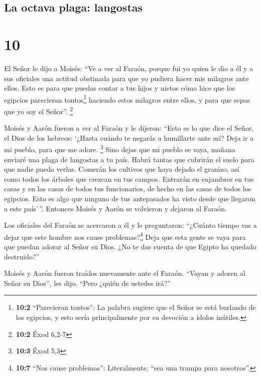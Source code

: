 \hypertarget{la-octava-plaga-langostas}{%
\subsection{La octava plaga:
langostas}\label{la-octava-plaga-langostas}}

\hypertarget{section-9}{%
\section{10}\label{section-9}}

 El Señor le dijo a Moisés: ``Ve a ver al Faraón, porque
fui yo quien le dio a él y a sus oficiales una actitud obstinada para
que yo pudiera hacer mis milagros ante ellos.  Esto es
para que puedas contar a tus hijos y nietos cómo hice que los egipcios
parecieran tontos\footnote{\textbf{10:2} ``Parecieran tontos'': La
  palabra sugiere que el Señor se está burlando de los egipcios, y esto
  sería principalmente por su devoción a ídolos inútiles.} haciendo
estos milagros entre ellos, y para que sepas que yo soy el Señor''.
\footnote{\textbf{10:2} Éxod 6,2-7}

 Moisés y Aarón fueron a ver al Faraón y le dijeron:
``Esto es lo que dice el Señor, el Dios de los hebreos: `¿Hasta cuándo
te negarás a humillarte ante mí? Deja ir a mi pueblo, para que me adore.
\footnote{\textbf{10:3} Éxod 5,3}  Sino dejas que mi
pueblo se vaya, mañana enviaré una plaga de langostas a tu país.
 Habrá tantas que cubrirán el suelo para que nadie pueda
verlas. Comerán los cultivos que haya dejado el granizo, así como todos
los árboles que crezcan en tus campos.  Entrarán en
enjambres en tus casas y en las casas de todos tus funcionarios, de
hecho en las casas de todos los egipcios. Esto es algo que ninguno de
tus antepasados ha visto desde que llegaron a este país'\,''. Entonces
Moisés y Aarón se volvieron y dejaron al Faraón.

 Los oficiales del Faraón se acercaron a él y le
preguntaron: ``¿Cuánto tiempo vas a dejar que este hombre nos cause
problemas?\footnote{\textbf{10:7} ``Nos cause problemas'': Literalmente,
  ``sea una trampa para nosotros''.} Deja que esta gente se vaya para
que puedan adorar al Señor su Dios. ¿No te das cuenta de que Egipto ha
quedado destruido?''

 Moisés y Aarón fueron traídos nuevamente ante el Faraón.
``Vayan y adoren al Señor su Dios'', les dijo. ``Pero ¿quién de ustedes
irá?''

